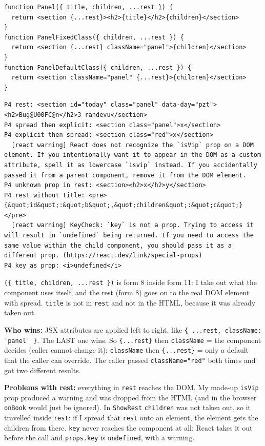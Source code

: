 \begin{lstlisting}
function Panel({ title, children, ...rest }) {
  return <section {...rest}><h2>{title}</h2>{children}</section>
}
function PanelFixedClass({ children, ...rest }) {
  return <section {...rest} className="panel">{children}</section>
}
function PanelDefaultClass({ children, ...rest }) {
  return <section className="panel" {...rest}>{children}</section>
}
\end{lstlisting}

\begin{lstlisting}
P4 rest: <section id="today" class="panel" data-day="pzt"><h2>Bug@U00FC@n</h2>3 randevu</section>
P4 spread then explicit: <section class="panel">x</section>
P4 explicit then spread: <section class="red">x</section>
  [react warning] React does not recognize the `isVip` prop on a DOM element. If you intentionally want it to appear in the DOM as a custom attribute, spell it as lowercase `isvip` instead. If you accidentally passed it from a parent component, remove it from the DOM element.
P4 unknown prop in rest: <section><h2>x</h2>y</section>
P4 rest without title: <pre>{&quot;id&quot;:&quot;b&quot;,&quot;children&quot;:&quot;c&quot;}</pre>
  [react warning] KeyCheck: `key` is not a prop. Trying to access it will result in `undefined` being returned. If you need to access the same value within the child component, you should pass it as a different prop. (https://react.dev/link/special-props)
P4 key as prop: <i>undefined</i>
\end{lstlisting}

\passthrough{\lstinline!(\{ title, children, ...rest \})!} is form 8 inside form 11: I take out what the component uses itself, and the rest (form 8)
goes on to the real DOM element with spread. \passthrough{\lstinline!title!} is not in \passthrough{\lstinline!rest!} and not in the HTML, because it was already taken out.

\textbf{Who wins:} JSX attributes are applied left to right, like \passthrough{\lstinline!\{ ...rest, className: 'panel' \}!}. The LAST one wins.
So \passthrough{\lstinline!\{...rest\}!} then \passthrough{\lstinline!className!} = the component decides (caller cannot change it); \passthrough{\lstinline!className!} then \passthrough{\lstinline!\{...rest\}!} = only a default
that the caller can override. The caller passed \passthrough{\lstinline!className="red"!} both times and got two different results.

\textbf{Problems with rest:} everything in \passthrough{\lstinline!rest!} reaches the DOM. My made-up \passthrough{\lstinline!isVip!} prop produced a warning and was dropped from the HTML
(and in the browser \passthrough{\lstinline!onBook!} would just be ignored). In \passthrough{\lstinline!ShowRest!} \passthrough{\lstinline!children!} was not taken out, so it travelled inside \passthrough{\lstinline!rest!}:
if I spread that \passthrough{\lstinline!rest!} onto an element, the element gets the children from there.
\passthrough{\lstinline!key!} never reaches the component at all: React takes it out before the call and \passthrough{\lstinline!props.key!} is \passthrough{\lstinline!undefined!}, with a warning.

